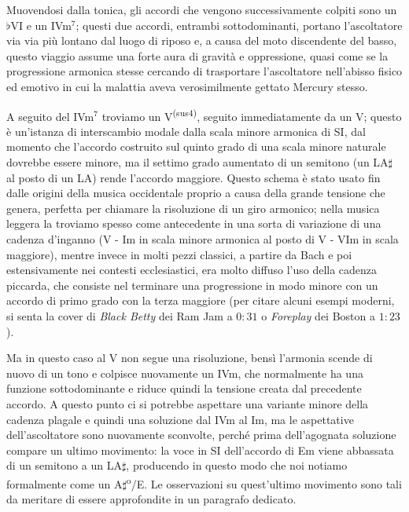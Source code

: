 \documentclass[12pt]{article}
\begin{document}
Muovendosi dalla tonica, gli accordi che vengono successivamente colpiti sono un \(\flat\)VI e un IVm\(^{7}\); questi due accordi, entrambi sottodominanti, portano l'ascoltatore via via più lontano dal luogo di riposo e, a causa del moto discendente del basso, questo viaggio assume una forte aura di gravità e oppressione, quasi come se la progressione armonica stesse cercando di trasportare l'ascoltatore nell'abisso fisico ed emotivo in cui la malattia aveva verosimilmente gettato Mercury stesso.

A seguito del IVm\(^{7}\) troviamo un V\textsuperscript{(sus\(4\))}, seguito immediatamente da un V; questo è un'istanza di interscambio modale dalla scala minore armonica di SI, dal momento che l'accordo costruito sul quinto grado di una scala minore naturale dovrebbe essere minore, ma il settimo grado aumentato di un semitono (un LA\(\sharp\) al posto di un LA) rende l'accordo maggiore. Questo schema è stato usato fin dalle origini della musica occidentale proprio a causa della grande tensione che genera, perfetta per chiamare la risoluzione di un giro armonico; nella musica leggera la troviamo spesso come antecedente in una sorta di variazione di una cadenza d'inganno (V - Im in scala minore armonica al posto di V - VIm in scala maggiore), mentre invece in molti pezzi classici, a partire da Bach e poi estensivamente nei contesti ecclesiastici, era molto diffuso l'uso della cadenza piccarda, che consiste nel terminare una progressione in modo minore con un accordo di primo grado con la terza maggiore (per citare alcuni esempi moderni, si senta la cover di \emph{Black Betty} dei Ram Jam a \(0:31\) o \emph{Foreplay} dei Boston a \(1:23\)).

Ma in questo caso al V non segue una risoluzione, bensì l'armonia scende di nuovo di un tono e colpisce nuovamente un IVm, che normalmente ha una funzione sottodominante e riduce quindi la tensione creata dal precedente accordo. A questo punto ci si potrebbe aspettare una variante minore della cadenza plagale e quindi una soluzione dal IVm al Im, ma le aspettative dell'ascoltatore sono nuovamente sconvolte, perché prima dell'agognata soluzione compare un ultimo movimento: la voce in SI dell'accordo di Em viene abbassata di un semitono  a un LA\(\sharp\), producendo in questo modo che noi notiamo formalmente come un A\(\sharp\)\textsuperscript{o}/E. Le osservazioni su quest'ultimo movimento sono tali da meritare di essere approfondite in un paragrafo dedicato.
\end{document}
